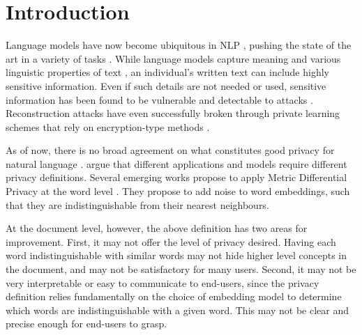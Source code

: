 \section{Introduction} 
\label{sec:intro} 



Language models have now become ubiquitous in NLP \cite{devlin2019bert, liu2019roberta, alsentzer2019publicly}, pushing the state of the art in a variety of tasks \cite{strubell2018linguistically, liu2019multi, mrini-etal-2021-recursive}. While language models capture meaning and various linguistic properties of text \cite{jawahar2019does, yenicelik2020does}, an individual's written text can include highly sensitive information. Even if such details are not needed or used, sensitive information has been found to be vulnerable and detectable to attacks \cite{pan2020privacy, attack_word_embs, carlini_attack}. Reconstruction attacks \cite{xie2021reconstruction} have even successfully broken through private learning schemes that rely on encryption-type methods \cite{huang-etal-2020-texthide}.

As of now, there is no broad agreement on what constitutes good privacy for natural language \cite{kairouz2019advances}. \citet{huang-etal-2020-texthide} argue that different applications and models require different privacy definitions. Several emerging works propose to apply Metric Differential Privacy \cite{orig_metricdp} at the word level \cite{metricdp,  mdp_low_dim, TEM, another_metric_DP, fancy_metricdp, metricDP_gumbel} . They propose to add noise to word embeddings, such that they are indistinguishable from their nearest neighbours.

At the document level, however, the above definition has two areas for improvement. First, it may not offer the level of privacy desired. Having each word indistinguishable with similar words may not hide higher level concepts in the document, and may not be satisfactory for many users. Second, it may not be very interpretable or easy to communicate to end-users, since the privacy definition relies fundamentally on the choice of embedding model to determine which words are indistinguishable with a given word. This may not be clear and precise enough for end-users to grasp.
%

